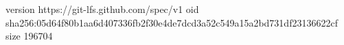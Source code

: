 version https://git-lfs.github.com/spec/v1
oid sha256:05d64f80b1aa6d407336fb2f30e4de7dcd3a52c549a15a2bd731df23136622cf
size 196704
